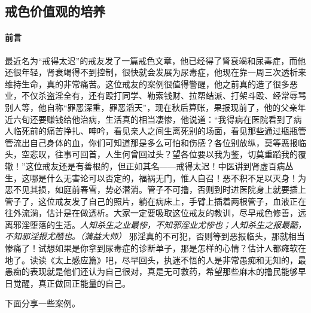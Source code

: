 \subsection{戒色价值观的培养}

\paragraph*{前言}

最近名为“戒得太迟”的戒友发了一篇戒色文章，他已经得了肾衰竭和尿毒症，而他还很年轻，肾衰竭得不到控制，很快就会发展为尿毒症，他现在靠一周三次透析来维持生命，真的非常痛苦。这位戒友的案例很值得警醒，他之前真的造了很多恶业，不仅杀盗淫全有，还有殴打同学、勒索钱财、拉帮结派、打架斗殴、经常辱骂别人等，他自称“罪恶深重，罪恶滔天”，现在秋后算账，果报现前了，他的父亲年近六旬还要赚钱给他治病，生活真的相当凄惨，他说道：“我得病在医院看到了病人临死前的痛苦挣扎、呻吟，看见亲人之间生离死别的场面，看见那些通过瓶瓶管管流出自己身体的血，你们可知道那是多么可怕和伤感？各位别放纵，莫等恶报临头，空悲叹，往事可回首，人生何曾回过头？望各位要以我为鉴，切莫重蹈我的覆辙！”这位戒友还是有善根的，但正如其名——戒得太迟！中医讲到肾虚百病丛生，这哪是什么无害论可以否定的，福祸无门，惟人自召！恶不积不足以灭身！为恶不见其损，如庭前春雪，势必潜消。管子不可撸，否则到时进医院身上就要插上管子了，这位戒友发了自己的照片，躺在病床上，手臂上插着两根管子，血液正在往外流淌，估计是在做透析。大家一定要吸取这位戒友的教训，尽早戒色修善，远离邪淫堕落的生活。\textit{人知杀生之业最惨，不知邪淫业尤惨也；人知杀生之报最酷，不知邪淫报尤酷也。（蕅益大师）} 邪淫真的不可犯，否则等到恶报临头，那就相当惨痛了！试想如果是你拿到尿毒症的诊断单子，那是怎样的心情？估计人都瘫软在地了。读读《太上感应篇》吧，尽早回头，执迷不悟的人是非常愚痴和无知的，最愚痴的表现就是他们还认为自己很对，真是无可救药，希望那些麻木的撸民能够早日觉醒，真正做回正能量的自己。

下面分享一些案例。

